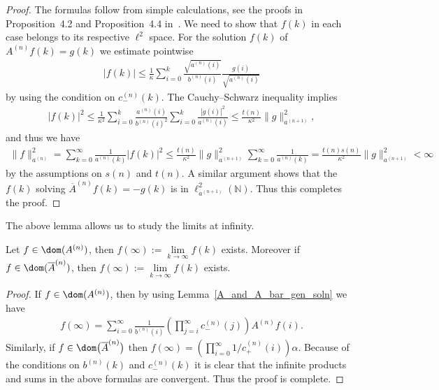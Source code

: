 \begin{proof}
The formulas follow from simple calculations, see the proofs in Proposition~4.2 and Proposition~4.4 in~\cite{KM1}.
We need to show that $f(k)$ in each case belongs to its respective $\ell^2$ space.
For the solution $f(k)$ of $A^{(n)}f(k) = g(k)$ we estimate pointwise
\begin{gather*}
|f(k)| \le \frac{1}{\kappa}\sum\limits_{i=0}^k\frac{\sqrt{a^{(n)}(i)}}{b^{(n)}(i)}\frac{g(i)}{\sqrt{a^{(n)}(i)}}
\end{gather*}
by using the condition on $c_-^{(n)}(k)$.
The Cauchy--Schwarz inequality implies
\begin{gather*}
|f(k)|^2 \le \frac{1}{\kappa^2}\sum\limits_{i=0}^k \frac{a^{(n)}(i)}{b^{(n)}(i)^2}\sum\limits_{i=0}^k
\frac{|g(i)|^2}{a^{(n)}(i)}\le \frac{t(n)}{\kappa^2}\|g\|_{a^{(n+1)}}^2,
\end{gather*}
and thus we have
\begin{gather*}
\|f\|_{a^{(n)}}^2 = \sum\limits_{k=0}^\infty \frac{1}{a^{(n)}(k)}|f(k)|^2 \le
\frac{t(n)}{\kappa^2}\|g\|_{a^{(n+1)}}^2\sum\limits_{k=0}^\infty \frac{1}{a^{(n)}(k)}=
\frac{t(n)s(n)}{\kappa^2}\|g\|_{a^{(n+1)}}^2 < \infty
\end{gather*}
by the assumptions on $s(n)$ and $t(n)$.
A similar argument shows that the $f(k)$ solving $\overline{A}^{(n)}f(k) = -g(k)$ is in $\ell_{a^{(n+1)}}^2({\mathbb
N})$.
Thus this completes the proof.
\end{proof}

The above lemma allows us to study the limits at inf\/inity.

\begin{lem}%
Let $f\in \dom(A^{(n)})$, then $f(\infty):= \lim\limits_{k\to\infty} f(k)$ exists.
Moreover if $f\in \dom(\overline{A}^{(n)})$, then $f(\infty):= \lim\limits_{k\to\infty} f(k)$ exists.
\end{lem}

\begin{proof}
If $f\in \dom(A^{(n)})$, then by using Lemma~\ref{A_and_A_bar_gen_soln} we have
\begin{gather*}
f(\infty) = \sum\limits_{i=0}^\infty
\frac{1}{b^{(n)}(i)}\left(\prod\limits_{j=i}^{\infty}c_-^{(n)}(j)\right)A^{(n)}f(i).
\end{gather*}
Similarly, if $f\in\dom\big(\overline{A}^{(n)}\big)$ then $f(\infty) = \left(\prod\limits_{i=0}^\infty 1/c_+^{(n)}(i)
\right)\alpha$.
Because of the conditions on $b^{(n)}(k)$ and $c_-^{(n)}(k)$ it is clear that the inf\/inite products and sums in the
above formulas are convergent.
Thus the proof is complete.
\end{proof}

